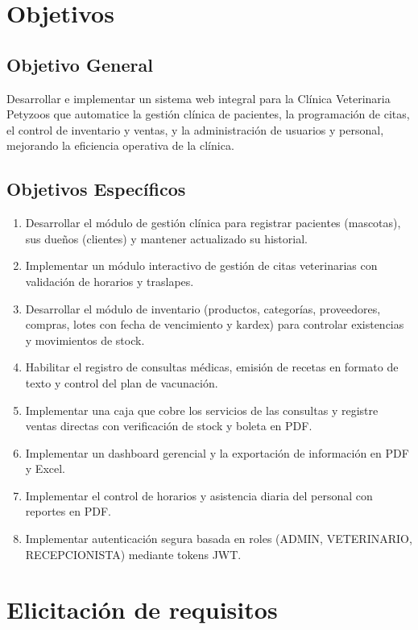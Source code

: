 \documentclass[11pt,a4paper]{report}
\begin{document}
\section{Objetivos}
\subsection{Objetivo General}
Desarrollar e implementar un sistema web integral para la Clínica Veterinaria Petyzoos que automatice la gestión clínica de pacientes, la programación de citas, el control de inventario y ventas, y la administración de usuarios y personal, mejorando la eficiencia operativa de la clínica.
\subsection{Objetivos Específicos}
\begin{enumerate}[label=OE\arabic*.]
\item Desarrollar el módulo de gestión clínica para registrar pacientes (mascotas), sus dueños (clientes) y mantener actualizado su historial.
\item Implementar un módulo interactivo de gestión de citas veterinarias con validación de horarios y traslapes.
\item Desarrollar el módulo de inventario (productos, categorías, proveedores, compras, lotes con fecha de vencimiento y kardex) para controlar existencias y movimientos de stock.
\item Habilitar el registro de consultas médicas, emisión de recetas en formato de texto y control del plan de vacunación.
\item Implementar una caja que cobre los servicios de las consultas y registre ventas directas con verificación de stock y boleta en PDF.
\item Implementar un dashboard gerencial y la exportación de información en PDF y Excel.
\item Implementar el control de horarios y asistencia diaria del personal con reportes en PDF.
\item Implementar autenticación segura basada en roles (ADMIN, VETERINARIO, RECEPCIONISTA) mediante tokens JWT.
\end{enumerate}

\section{Elicitación de requisitos}
\end{document}
